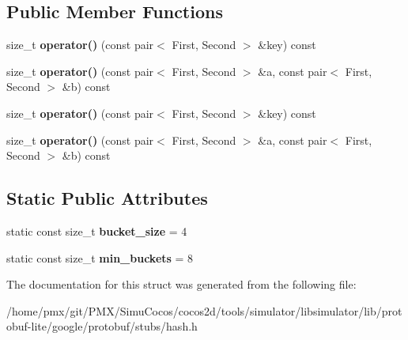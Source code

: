 \subsection*{Public Member Functions}
\begin{DoxyCompactItemize}
\item 
\mbox{\label{structgoogle_1_1protobuf_1_1hash_3_01pair_3_01First_00_01Second_01_4_01_4_a99ea0f80605dd7ff09c616a6317c6316}} 
size\+\_\+t {\bfseries operator()} (const pair$<$ First, Second $>$ \&key) const
\item 
\mbox{\label{structgoogle_1_1protobuf_1_1hash_3_01pair_3_01First_00_01Second_01_4_01_4_a8a80875a854191635002fedf69ab76a7}} 
size\+\_\+t {\bfseries operator()} (const pair$<$ First, Second $>$ \&a, const pair$<$ First, Second $>$ \&b) const
\item 
\mbox{\label{structgoogle_1_1protobuf_1_1hash_3_01pair_3_01First_00_01Second_01_4_01_4_a99ea0f80605dd7ff09c616a6317c6316}} 
size\+\_\+t {\bfseries operator()} (const pair$<$ First, Second $>$ \&key) const
\item 
\mbox{\label{structgoogle_1_1protobuf_1_1hash_3_01pair_3_01First_00_01Second_01_4_01_4_a8a80875a854191635002fedf69ab76a7}} 
size\+\_\+t {\bfseries operator()} (const pair$<$ First, Second $>$ \&a, const pair$<$ First, Second $>$ \&b) const
\end{DoxyCompactItemize}
\subsection*{Static Public Attributes}
\begin{DoxyCompactItemize}
\item 
\mbox{\label{structgoogle_1_1protobuf_1_1hash_3_01pair_3_01First_00_01Second_01_4_01_4_a35a9ddda77c96a622597ab114aacf382}} 
static const size\+\_\+t {\bfseries bucket\+\_\+size} = 4
\item 
\mbox{\label{structgoogle_1_1protobuf_1_1hash_3_01pair_3_01First_00_01Second_01_4_01_4_a726c63fe1e8c53e4cf16e261589a319e}} 
static const size\+\_\+t {\bfseries min\+\_\+buckets} = 8
\end{DoxyCompactItemize}


The documentation for this struct was generated from the following file\+:\begin{DoxyCompactItemize}
\item 
/home/pmx/git/\+P\+M\+X/\+Simu\+Cocos/cocos2d/tools/simulator/libsimulator/lib/protobuf-\/lite/google/protobuf/stubs/hash.\+h\end{DoxyCompactItemize}
